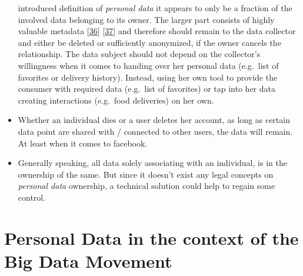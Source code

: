 \documentclass[12pt,english,a4paper,titlepage,cleardoublepage=empty,dottedtoc]{report}
\begin{document}
\begin{itemize}
  introduced definition of \emph{personal data} it appears to only be a
  fraction of the involved data belonging to its owner. The larger part
  consists of highly valuable metadata
  {[}\protect\hyperlink{ref-web_2013_why-metadata-matters}{36}{]}
  {[}\protect\hyperlink{ref-web_2016_why-you-need-metadata-for-big-data-to-success}{37}{]}
  and therefore should remain to the data collector and either be
  deleted or sufficiently anonymized, if the owner cancels the
  relationship. The data subject should not depend on the collector's
  willingness when it comes to handing over her personal data (e.g.~list
  of favorites or delivery history). Instead, using her own tool to
  provide the consumer with required data (e.g.~list of favorites) or
  tap into her data creating interactions (e.g.~food deliveries) on her
  own.
\item
  Whether an individual dies or a user deletes her account, as long as
  certain data point are shared with / connected to other users, the
  data will remain. At least when it comes to facebook.
\item
  Generally speaking, all data solely associating with an individual, is
  in the ownership of the same. But since it doesn't exist any legal
  concepts on \emph{personal data} ownership, a technical solution could
  help to regain some control.
\end{itemize}

\section{Personal Data in the context of the Big Data
Movement}\label{personal-data-in-the-context-of-the-big-data-movement}
\end{document}
